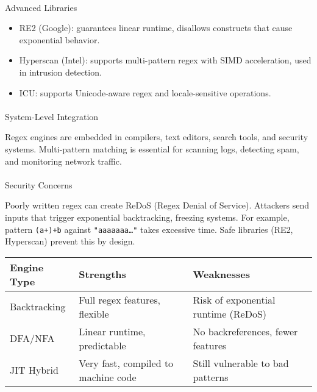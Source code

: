 \documentclass[
  letterpaper,
  DIV=11,
  numbers=noendperiod]{scrreprt}
\makeatletter
\let\oldparagraph\paragraph
\renewcommand{\paragraph}{
    \@ifstar
      \xxxParagraphStar
      \xxxParagraphNoStar
  }
\newcommand{\xxxParagraphStar}[1]{\oldparagraph*{#1}\mbox{}}
\newcommand{\xxxParagraphNoStar}[1]{\oldparagraph{#1}\mbox{}}
\providecommand{\tightlist}{%
  \setlength{\itemsep}{0pt}\setlength{\parskip}{0pt}}
\makeatother
\begin{document}
\paragraph{Advanced Libraries}\label{advanced-libraries}

\begin{itemize}
\tightlist
\item
  RE2 (Google): guarantees linear runtime, disallows constructs that
  cause exponential behavior.
\item
  Hyperscan (Intel): supports multi-pattern regex with SIMD
  acceleration, used in intrusion detection.
\item
  ICU: supports Unicode-aware regex and locale-sensitive operations.
\end{itemize}

\paragraph{System-Level Integration}\label{system-level-integration}

Regex engines are embedded in compilers, text editors, search tools, and
security systems. Multi-pattern matching is essential for scanning logs,
detecting spam, and monitoring network traffic.

\paragraph{Security Concerns}\label{security-concerns-1}

Poorly written regex can create ReDoS (Regex Denial of Service).
Attackers send inputs that trigger exponential backtracking, freezing
systems. For example, pattern \texttt{(a+)+b} against
\texttt{"aaaaaaa…"} takes excessive time. Safe libraries (RE2,
Hyperscan) prevent this by design.

\begin{longtable}[]{@{}
  >{\raggedright\arraybackslash}p{}
  >{\raggedright\arraybackslash}p{}
  >{\raggedright\arraybackslash}p{}@{}}
\toprule\noalign{}
\begin{minipage}[b]{\linewidth}\raggedright
Engine Type
\end{minipage} & \begin{minipage}[b]{\linewidth}\raggedright
Strengths
\end{minipage} & \begin{minipage}[b]{\linewidth}\raggedright
Weaknesses
\end{minipage} \\
\midrule\noalign{}
\endhead
\bottomrule\noalign{}
\endlastfoot
Backtracking & Full regex features, flexible & Risk of exponential
runtime (ReDoS) \\
DFA/NFA & Linear runtime, predictable & No backreferences, fewer
features \\
JIT Hybrid & Very fast, compiled to machine code & Still vulnerable to
bad patterns \\
\end{longtable}
\end{document}
